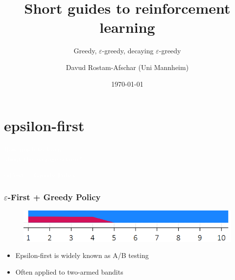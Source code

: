 \documentclass[11pt,table]{beamer}
\title[]{Short guides to reinforcement learning}
\subtitle[]{Greedy, $\varepsilon$-greedy, decaying $\varepsilon$-greedy}
\author[D. Rostam-Afschar]{\textcolor{gray1}{Davud Rostam-Afschar (Uni Mannheim)}}
\date[]{\today}
\begin{document}
\begin{frame}[plain]
  \titlepage
\end{frame}


\section{epsilon-first}
{
\begin{frame}
\centering
\Huge
\textcolor{white}{How much to learn\\ about the average return?}
\thispagestyle{empty}
\end{frame}
}
{
\begin{frame}
\centering
\Huge
\textcolor{white}{$\varepsilon$-First + Greedy Policy}
\thispagestyle{empty}
\end{frame}
}


\begin{frame}\frametitle{$\varepsilon$-First + Greedy Policy}
\renewcommand{\baselinestretch}{1}
\begin{figure}
    \centering
    \includegraphics[width=0.9\linewidth]{figures/epsilon first 2.png}
\end{figure}
\begin{itemize}
    \item Epsilon-first is widely known as A/B testing
    \item Often applied to two-armed bandits
\end{itemize}

\end{frame}
\end{document}
